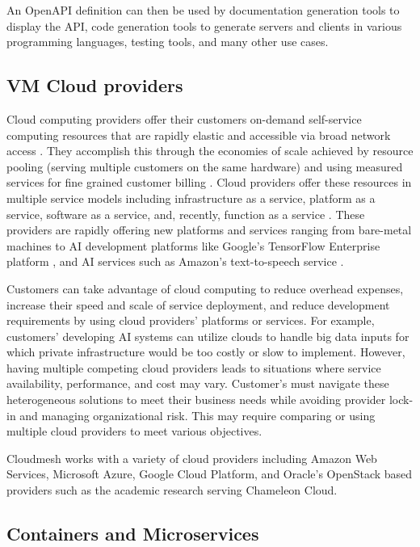 An OpenAPI definition can then be used by documentation generation tools to display the API, code generation tools to generate servers and clients in various programming languages, testing tools, and many other use cases.


\subsection{VM Cloud providers}\label{vm-cloud-providers}

Cloud computing providers offer their customers on-demand self-service
computing resources that are rapidly elastic and accessible via broad
network access \cite{nist-cloud-standard}.
They accomplish this through the economies of scale achieved by resource
pooling (serving multiple customers on the same hardware) and using
measured services for fine grained customer billing \cite{nist-cloud-standard}.
Cloud providers offer these resources in multiple service models
including infrastructure as a service, platform as a service, software
as a service, and, recently, function as a service
\cite{nist-cloud-standard}.
These providers are rapidly offering new platforms and services ranging
from bare-metal machines to AI development platforms like Google's
TensorFlow Enterprise platform \cite{www-tensorflow-enterprise}, and AI services
such as Amazon's text-to-speech service \cite{amazon-polly}.

Customers can take advantage of cloud computing to reduce overhead
expenses, increase their speed and scale of service deployment, and
reduce development requirements by using cloud providers' platforms or
services. For example, customers' developing AI systems can utilize
clouds to handle big data inputs for which private infrastructure would
be too costly or slow to implement. However, having multiple competing
cloud providers leads to situations where service availability,
performance, and cost may vary. Customer's must navigate these
heterogeneous solutions to meet their business needs while avoiding
provider lock-in and managing organizational risk. This may require
comparing or using multiple cloud providers to meet various objectives.

Cloudmesh works with a variety of cloud providers including Amazon Web
Services, Microsoft Azure, Google Cloud Platform, and Oracle's OpenStack
based providers such as the academic research serving Chameleon Cloud.

\subsection{Containers and Microservices}
\label{containers-and-microservices}


